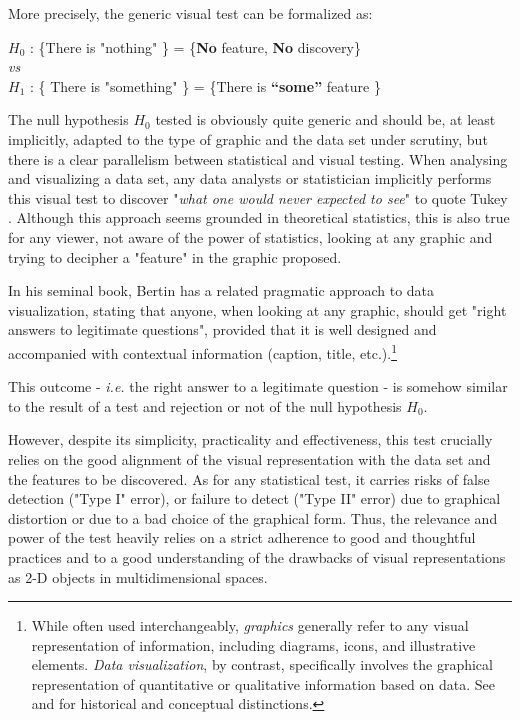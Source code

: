 \documentclass[11pt,twoside,a4paper]{article}
\begin{document}
More precisely, the generic visual test can be formalized as:
\begin{center}
  $H_0$ : \{There is "nothing"  \} = \{\textbf{No} feature, \textbf{No} discovery\} \\
 \emph{vs}\\
  $H_1$ : \{ There is "something" \} = \{There is \textbf{``some''} feature \}
\end{center}

The null hypothesis $H_0$ tested is obviously quite generic and should be, at least implicitly, adapted to  the type of graphic and the data set under scrutiny, but there is a clear parallelism between statistical and visual testing. When analysing and visualizing a data set, any data analysts or statistician implicitly performs this visual test to discover "\textit{what one would never expected to see}" to quote Tukey \citep{tukey1977exploratory}. Although this approach seems grounded in theoretical statistics, this is also true for any viewer, not aware of the power of statistics, looking at any graphic and trying to decipher a "feature" in the graphic proposed. 

In his seminal book, Bertin \citep{Bertin1983English}  has a related pragmatic approach to data visualization, stating that anyone, when looking at any graphic, should get "right answers  to legitimate questions",  provided that it is well designed and accompanied with contextual information (caption, title, etc.).\footnote{While often used interchangeably, \emph{graphics} generally refer to any visual representation of information, including diagrams, icons, and illustrative elements. \emph{Data visualization}, by contrast, specifically involves the graphical representation of quantitative or qualitative information based on data. See \citep{Friendly2008} and \citep{Cairo2012} for historical and conceptual distinctions.}

This outcome - \textit{i.e.} the right answer to a legitimate question - is somehow similar to the result of a test and rejection or not of the null hypothesis $H_0$.


However, despite its simplicity, practicality and effectiveness, this test crucially relies on the good alignment of the visual representation with the data set and the features to be discovered. As for any  statistical test, it carries risks of false detection ("Type I" error), or  failure to detect ("Type II" error) due to graphical distortion or due to a bad choice of the graphical form. Thus, the  relevance and power of the test heavily relies on a strict adherence to good and thoughtful practices and to a good understanding of the drawbacks of visual representations as 2-D objects in multidimensional spaces. 
 
\end{document}
